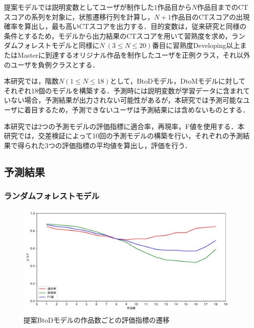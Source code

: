 \documentclass[submit,ses,noauthor]{ipsj}
\begin{document}
提案モデルでは説明変数としてユーザが制作した$1$作品目から$N$作品目までのCTスコアの系列を対象に，状態遷移行列を計算し，$N+1$作品目のCTスコアの出現確率を算出し，最も高いCTスコアを出力する．目的変数は，従来研究と同様の条件とするため，モデルから出力結果のCTスコアを用いて習熟度を求め，ランダムフォレストモデルと同様に{$N~(3 \leq N \leq 20)$}番目に習熟度Developing以上またはMasterに到達するオリジナル作品を制作したユーザを正例クラス，それ以外のユーザを負例クラスとする．

本研究では，階数$N(1\leq N \leq 18)$として，BtoDモデル，DtoMモデルに対してそれぞれ18個のモデルを構築する．予測時には説明変数が学習データに含まれていない場合，予測結果が出力されない可能性があるが，本研究では予測可能なユーザに着目するため，予測できないユーザは予測結果には含めないものとする．

本研究では2つの予測モデルの評価指標に適合率，再現率，F値を使用する．本研究では，交差検証によって10回の予測モデルの構築を行い，それぞれの予測結果で得られた3つの評価指標の平均値を算出し，評価を行う．

\vspace{-2mm}
\subsection{予測結果}

\subsubsection{ランダムフォレストモデル}\label{sec:randResult}


\begin{figure}[t]
	\centering
	\includegraphics[width=1.0\linewidth]{Okamoto_fig/btod-lines2.pdf}
	\caption{提案BtoDモデルの作品数ごとの評価指標の遷移}
	\label{fig:btod-lines}
 \vspace{-2mm}
\end{figure}
\end{document}
